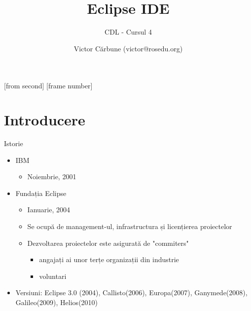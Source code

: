 \documentclass{beamer}
\title[Eclipse IDE]{Eclipse IDE}
\subtitle{CDL - Cursul 4}
\institute[ROSEdu]{ROSEdu}
\author[Victor]{Victor Cărbune (\small victor@rosedu.org)}
\begin{document}
[from second]
[frame number]

\frame{\titlepage}

\begin{frame}
\tableofcontents
\end{frame}

\section{Introducere}


\begin{frame}{Istorie}

\begin{itemize}
	\item IBM
 		\begin{itemize}
		\pause	
		\item Noiembrie, 2001
		\end{itemize}
	\pause
	\vspace{4mm} 
	\item Fundația Eclipse
		\begin{itemize}	
		\pause	
		\item Ianuarie, 2004
		\pause
		\item Se ocupă de management-ul, infrastructura și licențierea proiectelor 
		\pause	
		\item Dezvoltarea proiectelor este asigurată de "commiters"
			\begin{itemize}	
			\pause	
			\item angajați ai unor terțe organizații din industrie
			\pause	
			\item voluntari
			\end{itemize}
		\end{itemize}
	\vspace{4mm} 
	\pause	
	\item Versiuni: Eclipse 3.0 (2004), Callisto(2006), Europa(2007), Ganymede(2008), Galileo(2009), Helios(2010)
\end{itemize}
\end{frame}
\end{document}
